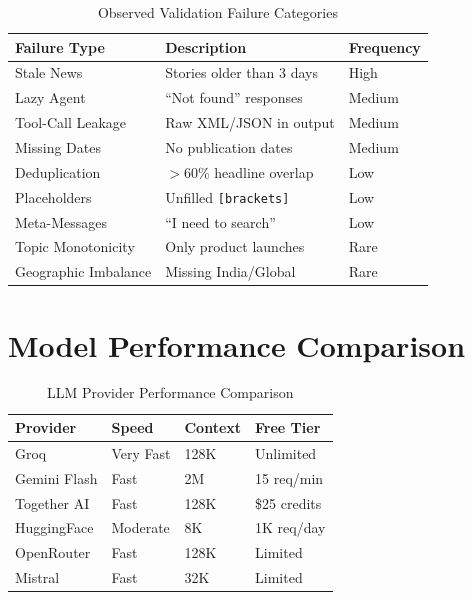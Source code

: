 \documentclass[12pt,a4paper]{report}
\begin{document}
\begin{table}[htbp]
\caption{Observed Validation Failure Categories}
\centering
\begin{tabular}{@{}lp{5cm}l@{}}
\toprule
\textbf{Failure Type} & \textbf{Description} & \textbf{Frequency} \\
\midrule
Stale News & Stories older than 3 days & High \\
Lazy Agent & ``Not found'' responses & Medium \\
Tool-Call Leakage & Raw XML/JSON in output & Medium \\
Missing Dates & No publication dates & Medium \\
Deduplication & $>$60\% headline overlap & Low \\
Placeholders & Unfilled \texttt{[brackets]} & Low \\
Meta-Messages & ``I need to search'' & Low \\
Topic Monotonicity & Only product launches & Rare \\
Geographic Imbalance & Missing India/Global & Rare \\
\bottomrule
\end{tabular}
\end{table}

\section{Model Performance Comparison}

\begin{table}[htbp]
\caption{LLM Provider Performance Comparison}
\centering
\begin{tabular}{@{}llll@{}}
\toprule
\textbf{Provider} & \textbf{Speed} & \textbf{Context} & \textbf{Free Tier} \\
\midrule
Groq & Very Fast & 128K & Unlimited \\
Gemini Flash & Fast & 2M & 15 req/min \\
Together AI & Fast & 128K & \$25 credits \\
HuggingFace & Moderate & 8K & 1K req/day \\
OpenRouter & Fast & 128K & Limited \\
Mistral & Fast & 32K & Limited \\
\bottomrule
\end{tabular}
\end{table}
\end{document}
